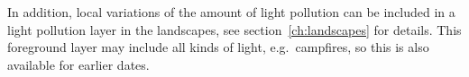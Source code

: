 In addition, local variations of
the amount of light pollution can be included in a light pollution
layer in the landscapes, see
section~\ref{ch:landscapes} for details. This foreground layer may include 
all kinds of light, e.g.\  campfires, so this is also available for earlier 
dates.


